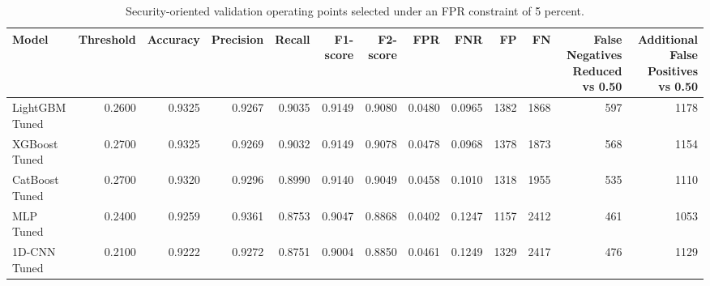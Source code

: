 \begin{table}
\caption{Security-oriented validation operating points selected under an FPR constraint of 5 percent.}
\label{tab:security_thresholds}
\begin{tabular}{lrrrrrrrrrrrr}
\toprule
Model & Threshold & Accuracy & Precision & Recall & F1-score & F2-score & FPR & FNR & FP & FN & False Negatives Reduced vs 0.50 & Additional False Positives vs 0.50 \\
\midrule
LightGBM Tuned & 0.2600 & 0.9325 & 0.9267 & 0.9035 & 0.9149 & 0.9080 & 0.0480 & 0.0965 & 1382 & 1868 & 597 & 1178 \\
XGBoost Tuned & 0.2700 & 0.9325 & 0.9269 & 0.9032 & 0.9149 & 0.9078 & 0.0478 & 0.0968 & 1378 & 1873 & 568 & 1154 \\
CatBoost Tuned & 0.2700 & 0.9320 & 0.9296 & 0.8990 & 0.9140 & 0.9049 & 0.0458 & 0.1010 & 1318 & 1955 & 535 & 1110 \\
MLP Tuned & 0.2400 & 0.9259 & 0.9361 & 0.8753 & 0.9047 & 0.8868 & 0.0402 & 0.1247 & 1157 & 2412 & 461 & 1053 \\
1D-CNN Tuned & 0.2100 & 0.9222 & 0.9272 & 0.8751 & 0.9004 & 0.8850 & 0.0461 & 0.1249 & 1329 & 2417 & 476 & 1129 \\
\bottomrule
\end{tabular}
\end{table}
